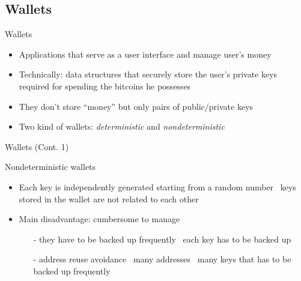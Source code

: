 \documentclass{beamer}
\begin{document}
  \subsection{Wallets}
  \begin{frame}{Wallets}
    \begin{itemize}
      \item Applications that serve as a user interface and manage user’s money 
      \item Technically: data structures that securely store the user’s private keys required for spending the bitcoins he possesses 
      \item They don't store ``money'' but only pairs of public/private keys
      \item Two kind of wallets: \emph{deterministic} and \emph{nondeterministic}
    \end{itemize}
  \end{frame}




  \begin{frame}{Wallets (Cont. 1)}
    \begin{block}{Nondeterministic wallets}
      \begin{itemize}
        \item Each key is independently generated starting from a random number \MVRightarrow\, keys stored in the wallet are not related to each other \
        \item Main disadvantage: cumbersome to manage 
        \begin{itemize}
          \item[-] they have to be backed up frequently \MVRightarrow\, each key has to be backed up 
          \item[-] address reuse avoidance \MVRightarrow\, many addresses \MVRightarrow\, many keys that has to be backed up frequently
        \end{itemize}
      \end{itemize}
    \end{block}
  \end{frame}
\end{document}
